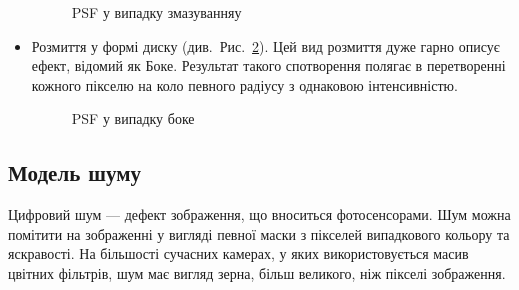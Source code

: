 \documentclass{diploma}
\begin{document}
\begin{itemize}
\begin{figure}[ht!]
{            }
            \hfill
            \caption{PSF у випадку змазуванняу}
            \label{fig:motion-blur}
          \end{figure}
        \item Розмиття у формі диску (див.~Рис.~\ref{fig:disk-blur}).
          Цей вид розмиття дуже гарно описує ефект, відомий як Боке.
          Результат такого спотворення полягає в перетворенні кожного пікселю
          на коло певного радіусу з однаковою інтенсивністю.
          \begin{figure}[t]
            \hfill
            \caption{PSF у випадку боке}
            \label{fig:disk-blur}
          \end{figure}
      \end{itemize}
    \subsection{Модель шуму}
      Цифровий шум --- дефект зображення, що вноситься фотосенсорами.
      Шум можна помітити на зображенні у вигляді певної маски з пікселей
      випадкового кольору та яскравості.
      На більшості сучасних камерах, у яких використовується масив цвітних
      фільтрів, шум має вигляд зерна, більш великого, ніж пікселі зображення.
\end{document}
